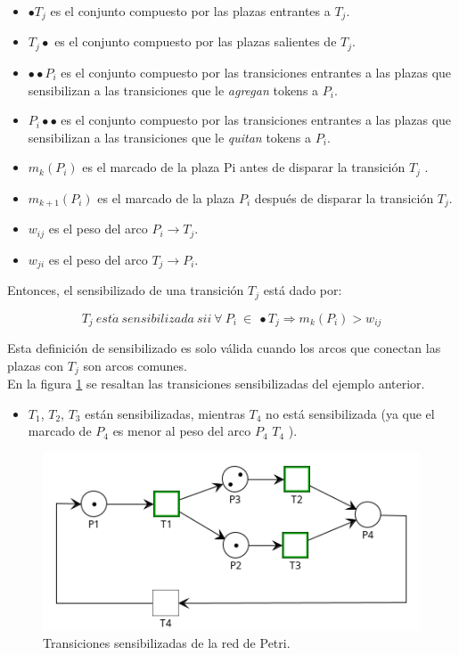 \begin{itemize}
    \item $\bullet T_j$ es el conjunto compuesto por las plazas entrantes a $T_j$.
    \item $T_j \bullet$  es el conjunto compuesto por las plazas salientes de $T_j$.
    \item $\bullet \bullet P_i$ es el conjunto compuesto por las transiciones entrantes a las plazas que sensibilizan a las transiciones que le \textit{agregan} tokens a $P_i$.
    \item $P_i \bullet \bullet$  es el conjunto compuesto por las transiciones entrantes a las plazas que sensibilizan a las transiciones que le \textit{quitan} tokens a $P_i$.
    \item $m_k(P_i)$ es el marcado de la plaza Pi antes de disparar la transición $T_j$ .
    \item $m_{k+1}(P_i)$ es el marcado de la plaza $P_i$ después de disparar la transición $T_j$.
    \item $w_{ij}$ es el peso del arco $P_i \rightarrow T_j$.
    \item $w_{ji}$ es el peso del arco $T_j \rightarrow P_i$.
\end{itemize}

\noindent Entonces, el sensibilizado de una transición $T_j$ está dado por:

\begin{equation}
    T_j \ est\acute{a} \ sensibilizada \ sii \ \forall \ P_i \ \in \ \bullet T_j \Rightarrow m_k (P_i) > w_{ij}
\end{equation}

Esta definición de sensibilizado es solo válida cuando los arcos que conectan las plazas con $T_j$ son arcos comunes. \\
En la figura \ref{fig:rdp2.2_marcada} se resaltan las transiciones sensibilizadas del ejemplo anterior.

\begin{itemize}
    \item $T_1$, $T_2$, $T_3$ están sensibilizadas, mientras $T_4$ no está sensibilizada (ya que el marcado de $P_4$ es menor al peso del arco $P_4$ \rightarrow $T_4$ ).
\end{itemize}

\begin{figure}[H]
	\centering
	\includegraphics[scale=1.00]{Figures/marco teorico/imag2.png}
	\caption{Transiciones sensibilizadas de la red de Petri.}
	\label{fig:rdp2.2_marcada}
  \end{figure}


